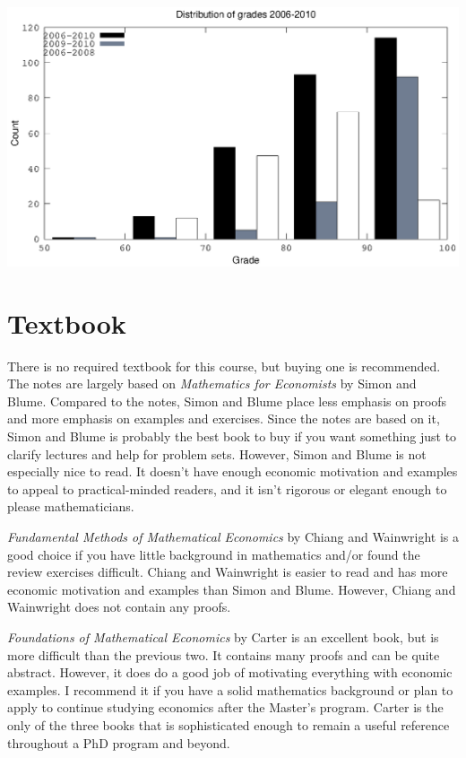 \documentclass[10pt]{article}
\begin{document}
\begin{centering}
  \includegraphics[width=0.8\linewidth]{526gradeDist}
\end{centering}

\section{Textbook}

There is no required textbook for this course, but buying one is
recommended.  The notes are largely based on \textit{Mathematics for
  Economists} by Simon and Blume. Compared to the notes, Simon and
Blume place less emphasis on proofs and more emphasis on examples and
exercises. Since the notes are based on it, Simon and Blume is
probably the best book to buy if you want something just to clarify
lectures and help for problem sets. However, Simon and Blume is not
especially nice to read. It doesn't have enough economic motivation
and examples to appeal to practical-minded readers, and it isn't
rigorous or elegant enough to please mathematicians.

\textit{Fundamental Methods of Mathematical Economics} by Chiang and
Wainwright is a good choice if you have little background in
mathematics and/or found the review exercises difficult. Chiang and
Wainwright is easier to read and has more economic motivation and
examples than Simon and Blume. However, Chiang and Wainwright does not
contain any proofs. 

\textit{Foundations of Mathematical Economics} by Carter is an excellent
book, but is more difficult than the previous two. It contains many
proofs and can be quite abstract. However, it does do a good job of
motivating everything with economic examples. I recommend it if you
have a solid mathematics background or plan to apply to continue
studying economics after the Master's program. Carter is the only of
the three books that is sophisticated enough to remain a useful
reference throughout a PhD program and beyond.
\end{document}
